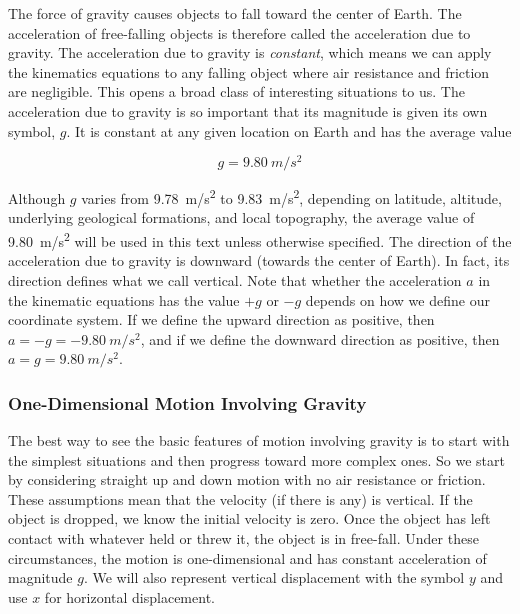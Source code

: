 \documentclass[main-ap-physics.tex]{subfiles}
\begin{document}
\vspace{1em}

The force of gravity causes objects to fall toward the center of Earth. The acceleration of free-falling objects is therefore called the \gls{acceleration due to gravity}. The acceleration due to gravity is \textit{constant}, which means we can apply the kinematics equations to any falling object where air resistance and friction are negligible. This opens a broad class of interesting situations to us. The acceleration due to gravity is so important that its magnitude is given its own symbol, $g$. It is constant at any given location on Earth and has the average value

\begin{equation}
    g = \SI{9.80}{m/s^2}
\end{equation}

Although $g$ varies from \SI{9.78}{m/s^2} to \SI{9.83}{m/s^2}, depending on latitude, altitude, underlying geological formations, and local topography, the average value of \SI{9.80}{m/s^2} will be used in this text unless otherwise specified. The direction of the acceleration due to gravity is downward (towards the center of Earth). In fact, its direction defines what we call vertical. Note that whether the acceleration $a$ in the kinematic equations has the value $+g$ or $-g$ depends on how we define our coordinate system. If we define the upward direction as positive, then $a = -g = -\SI{9.80}{m/s^2}$, and if we define the downward direction as positive, then $a = g = \SI{9.80}{m/s^2}$.

\subsubsection*{One-Dimensional Motion Involving Gravity}

The best way to see the basic features of motion involving gravity is to start with the simplest situations and then progress toward more complex ones. So we start by considering straight up and down motion with no air resistance or friction. These assumptions mean that the velocity (if there is any) is vertical. If the object is dropped, we know the initial velocity is zero. Once the object has left contact with whatever held or threw it, the object is in free-fall. Under these circumstances, the motion is one-dimensional and has constant acceleration of magnitude $g$. We will also represent vertical displacement with the symbol $y$ and use $x$ for horizontal displacement.
\end{document}

